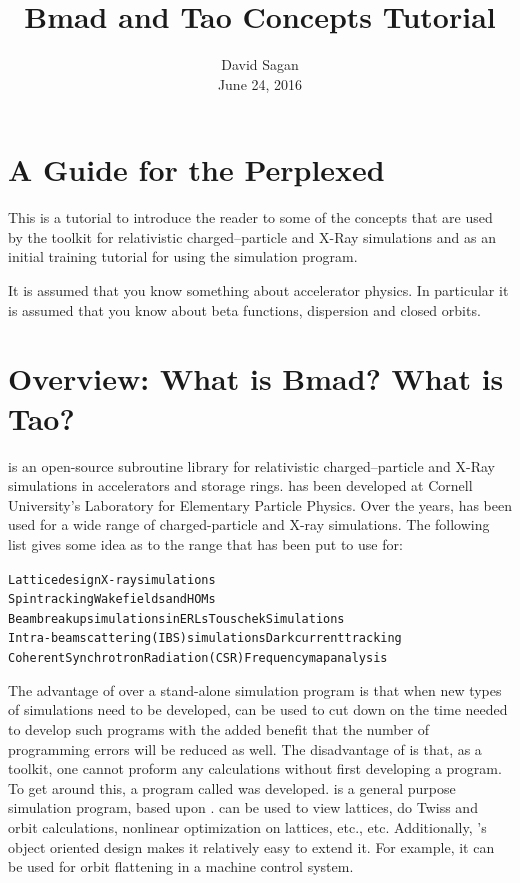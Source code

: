 \documentclass{hitec}
\title{Bmad and Tao Concepts Tutorial}
\author{}
\date{David Sagan \\ June 24, 2016}
\newcommand{\Section}[1]{\section{#1}\vspace*{-1ex}}
\newenvironment{display}
  {\vspace*{-1.5ex} \begin{alltt}}
  {\end{alltt} \vspace*{-1.0ex}}
\begin{document}
\maketitle

\tableofcontents

\Section{A Guide for the Perplexed}
\label{s:guide}

This is a tutorial to introduce the reader to some of the concepts that are used by the \bmad toolkit
for relativistic charged--particle and X-Ray simulations and as an initial training tutorial
for using the \tao simulation program.

It is assumed that you know something about accelerator physics. In particular it is assumed that
you know about beta functions, dispersion and closed orbits.

\Section{Overview: What is Bmad? What is Tao?}
\label{s:overview}

\bmad is an open-source subroutine library for relativistic
charged--particle and X-Ray simulations in accelerators and
storage rings. \bmad has been developed at Cornell University's
Laboratory for Elementary Particle Physics.
Over the years, \bmad has been used for a wide range of charged-particle and X-ray
simulations. The following list gives some idea as to the range that \bmad has been put to use
for:
\begin{display}
  Lattice design                              X-ray simulations
  Spin tracking                               Wakefields and HOMs
  Beam breakup simulations in ERLs            Touschek Simulations
  Intra-beam scattering (IBS) simulations     Dark current tracking
  Coherent Synchrotron Radiation (CSR)        Frequency map analysis
\end{display}

The advantage of \bmad over a stand-alone simulation program is that when new types of simulations
need to be developed, \bmad can be used to cut down on the time needed to develop such programs
with the added benefit that the number of programming errors will be reduced
as well. The disadvantage of \bmad is that, as a toolkit, one cannot proform any calculations
without first developing a program. To get around this, a program called \tao was developed.
\tao is a general purpose simulation program, based upon \bmad. \tao can be used to view
lattices, do Twiss and orbit calculations, nonlinear optimization on lattices, etc., etc.
Additionally, \tao's object oriented design makes it relatively easy to extend it. For
example, it can be used for orbit flattening in a machine control system.
\end{document}
